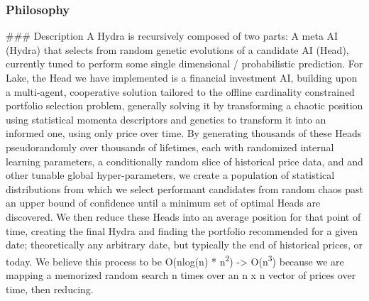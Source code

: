 \documentclass[11pt, a4paper]{awesome-cv}
\begin{document}
\begin{cvletter}
\subsubsection{Philosophy}

\#\#\# Description
A Hydra is recursively composed of two parts: A meta AI (Hydra) that selects from random genetic evolutions of a candidate AI (Head), currently tuned to perform some single dimensional / probabilistic prediction. For Lake, the Head we have implemented is a financial investment AI, building upon a multi-agent, cooperative solution tailored to the offline cardinality constrained portfolio selection problem, generally solving it by transforming a chaotic position using statistical momenta descriptors and genetics to transform it into an informed one, using only price over time.
By generating thousands of these Heads pseudorandomly over thousands of lifetimes, each with randomized internal learning parameters, a conditionally random slice of historical price data, and and other tunable global hyper-parameters, we create a population of statistical distributions from which we select performant candidates from random chaos past an upper bound of confidence until a minimum set of optimal Heads are discovered. We then reduce these Heads into an average position for that point of time, creating the final Hydra and finding the portfolio recommended for a given date; theoretically any arbitrary date, but typically the end of historical prices, or today. We believe this process to be O(nlog(n) * n\textsuperscript{2}) -> O(n\textsuperscript{3}) because we are mapping a memorized random search n times over an n x n vector of prices over time, then reducing.


\end{cvletter}
\end{document}
